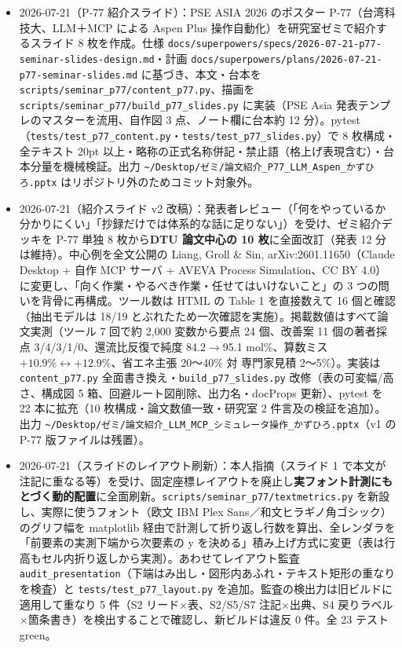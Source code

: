 \documentclass[11pt,a4paper]{jsarticle}
\begin{document}
\begin{itemize}[nosep]
  \item 2026-07-21（P-77 紹介スライド）：PSE ASIA 2026 のポスター P-77（台湾科技大、LLM＋MCP による Aspen Plus 操作自動化）を研究室ゼミで紹介するスライド 8 枚を作成。仕様 \texttt{docs/superpowers/specs/2026-07-21-p77-seminar-slides-design.md}・計画 \texttt{docs/superpowers/plans/2026-07-21-p77-seminar-slides.md} に基づき、本文・台本を \texttt{scripts/seminar\_p77/content\_p77.py}、描画を \texttt{scripts/seminar\_p77/build\_p77\_slides.py} に実装（PSE Asia 発表テンプレのマスターを流用、自作図 3 点、ノート欄に台本約 12 分）。pytest（\texttt{tests/test\_p77\_content.py}・\texttt{tests/test\_p77\_slides.py}）で 8 枚構成・全テキスト 20pt 以上・略称の正式名称併記・禁止語（格上げ表現含む）・台本分量を機械検証。出力 \texttt{\textasciitilde/Desktop/ゼミ/論文紹介\_P77\_LLM\_Aspen\_かずひろ.pptx} はリポジトリ外のためコミット対象外。
  \item 2026-07-21（紹介スライド v2 改稿）：発表者レビュー（「何をやっているか分かりにくい」「抄録だけでは体系的な話に足りない」）を受け、ゼミ紹介デッキを P-77 単独 8 枚から\textbf{DTU 論文中心の 10 枚}に全面改訂（発表 12 分は維持）。中心例を全文公開の Liang, Groll \& Sin, arXiv:2601.11650（Claude Desktop + 自作 MCP サーバ + AVEVA Process Simulation、CC BY 4.0）に変更し、「向く作業・やるべき作業・任せてはいけないこと」の 3 つの問いを背骨に再構成。ツール数は HTML の Table 1 を直接数えて 16 個と確認（抽出モデルは 18/19 とぶれたため一次確認を実施）。掲載数値はすべて論文実測（ツール 7 回で約 2{,}000 変数から要点 24 個、改善案 11 個の著者採点 3/4/3/1/0、還流比反復で純度 84.2$\to$95.1 mol\%、算数ミス $+10.9\%\leftrightarrow+12.9\%$、省エネ主張 20〜40\% 対 専門家見積 2〜5\%）。実装は \texttt{content\_p77.py} 全面書き換え・\texttt{build\_p77\_slides.py} 改修（表の可変幅/高さ、構成図 5 箱、回避ルート図削除、出力名・docProps 更新）、pytest を 22 本に拡充（10 枚構成・論文数値一致・研究室 2 件言及の検証を追加）。出力 \texttt{\textasciitilde/Desktop/ゼミ/論文紹介\_LLM\_MCP\_シミュレータ操作\_かずひろ.pptx}（v1 の P-77 版ファイルは残置）。
  \item 2026-07-21（スライドのレイアウト刷新）：本人指摘（スライド 1 で本文が注記に重なる等）を受け、固定座標レイアウトを廃止し\textbf{実フォント計測にもとづく動的配置}に全面刷新。\texttt{scripts/seminar\_p77/textmetrics.py} を新設し、実際に使うフォント（欧文 IBM Plex Sans／和文ヒラギノ角ゴシック）のグリフ幅を matplotlib 経由で計測して折り返し行数を算出、全レンダラを「前要素の実測下端から次要素の y を決める」積み上げ方式に変更（表は行高もセル内折り返しから実測）。あわせてレイアウト監査 \texttt{audit\_presentation}（下端はみ出し・図形内あふれ・テキスト矩形の重なりを検査）と \texttt{tests/test\_p77\_layout.py} を追加。監査の検出力は旧ビルドに適用して重なり 5 件（S2 リード×表、S2/S5/S7 注記×出典、S4 戻りラベル×箇条書き）を検出することで確認し、新ビルドは違反 0 件。全 23 テスト green。

\end{itemize}
\end{document}

